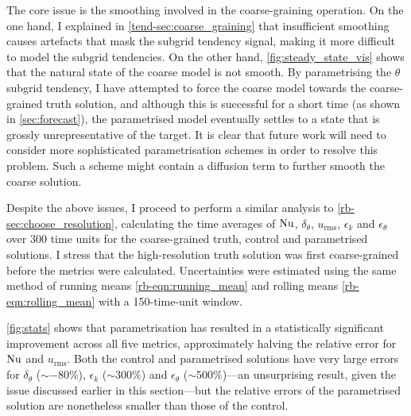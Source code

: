 \documentclass[../main.tex]{subfiles}
\begin{document}
The core issue is the smoothing involved in the coarse-graining operation. On
the one hand, I explained in \cref{tend-sec:coarse_graining} that insufficient
smoothing causes artefacts that mask the subgrid tendency signal, making it
more difficult to model the subgrid tendencies. On the other hand,
\cref{fig:steady_state_vis} shows that the natural state of the coarse model is
not smooth. By parametrising the $\theta$ subgrid tendency, I have attempted to
force the coarse model towards the coarse-grained truth solution, and although
this is successful for a short time (as shown in \cref{sec:forecast}), the
parametrised model eventually settles to a state that is grossly
unrepresentative of the target. It is clear that future work will need to
consider more sophisticated parametrisation schemes in order to resolve this
problem. Such a scheme might contain a diffusion term to further smooth
the coarse solution.

Despite the above issues, I proceed to perform a similar analysis to
\cref{rb-sec:choose_resolution}, calculating the time averages of $\mathrm{Nu}$,
$\delta_\theta$, $u_\mathrm{rms}$, $\epsilon_k$ and $\epsilon_\theta$ over 300
time units for the coarse-grained truth, control and parametrised solutions. I
stress that the high-resolution truth solution was first coarse-grained before
the metrics were calculated. Uncertainties were estimated using the same method
of running means \cref{rb-eqn:running_mean} and rolling means
\cref{rb-eqn:rolling_mean} with a 150-time-unit window.

\cref{fig:stats} shows that parametrisation has resulted in a statistically
significant improvement across all five metrics, approximately halving the
relative error for $\mathrm{Nu}$ and $u_\mathrm{rms}$. Both the control and
parametrised solutions have very large errors for $\delta_\theta$ ($\sim -80
\%$), $\epsilon_k$ ($\sim 300 \%$) and $\epsilon_\theta$ ($\sim 500 \%$)---an
unsurprising result, given the issue discussed earlier in this section---but
the relative errors of the parametrised solution are nonetheless smaller than
those of the control.
\end{document}
